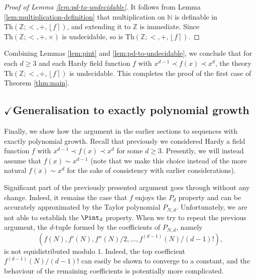 \documentclass{amsart}
\theoremstyle{definition}
\newcommand{\nint}[1]{\left\lfloor #1 \right\rceil}
\newcommand{\NN}{\mathbb{N}}
\newcommand{\ZZ}{\mathbb{Z}}
\newcommand{\theory}[1]{\mathrm{Th}(#1)}
\begin{document}
\begin{proof}[Proof of Lemma \ref{lem:pd-to-undecidable}]
It follows from Lemma \ref{lem:multiplication-definition} that multiplication on $\NN$ is definable in $\theory{\ZZ; <, +, \nint{f}}$, and extending it to $\ZZ$ is immediate. Since $\theory{\ZZ; <, +, \times}$ is undecidable, so is $\theory{\ZZ; <, +, \nint{f}}$.
\end{proof}


Combining Lemmas \ref{lem:pint} and \ref{lem:pd-to-undecidable}, we conclude that for each $d \geq 3$ and each Hardy field function $f$ with $x^{d-1} \prec f(x) \prec x^d$, the theory $\theory{\ZZ;<,+,\nint{f}}$ is undecidable. This completes the proof of the first case of Theorem \ref{thm:main}.


\subsection{$\checkmark$Generalisation to exactly polynomial growth}
\label{sec:super-linear-generalisation}
Finally, we show how the argument in the earlier sections to sequences with exactly polynomial growth. Recall that previously we considered Hardy a field function $f$ with $x^{d-1} \prec f(x) \prec x^d$ for some $d \geq 3$. Presently, we will instead assume that $f(x) \sim x^{d-1}$ (note that we make this choice instead of the more natural $f(x) \sim x^{d}$ for the sake of consistency with earlier considerations). 

Significant part of the previously presented argument goes through without any change. Indeed, it remains the case that $f$ enjoys the $P_{d}$ property and can be accurately approximated by the Taylor polynomial $P_{N,d}$. Unfortunately, we are not able to establish the $\Pint_d$ property. When we try to repeat the previous argument, the $d$-tuple formed by the coefficients of $P_{N,d}$, namely
\begin{equation*}
(f(N), f'(N), f''(N)/2, \dots, f^{(d-1)}(N)/(d-1)!),
\end{equation*}
is not equidistributed modulo $1$. Indeed, the top coefficient $f^{(d-1)}(N)/(d-1)!$ can easily be shown to converge to a constant, and the behaviour of the remaining coefficients is potentially more complicated.
\end{document}
